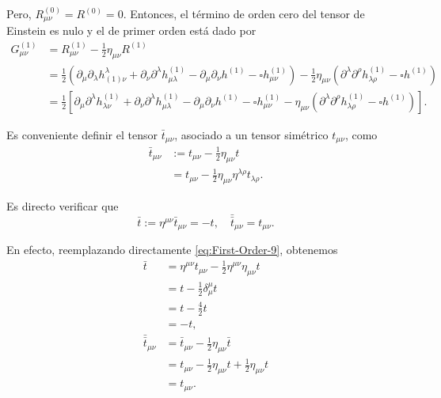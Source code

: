 \documentclass[letterpaper,11pt]{article}
\begin{document}
Pero, $R_{\mu\nu}^{(0)} = R^{(0)} = 0$. Entonces, el término de orden cero del tensor de Einstein es nulo y el de primer orden está dado por
\begin{align}
G_{\mu\nu}^{(1)} &= R_{\mu\nu}^{(1)} - \frac{1}{2}\eta_{\mu\nu} R^{(1)} \nonumber \\
&= \frac{1}{2} \left(\partial_{\mu} \partial_{\lambda} h_{(1)\nu}^{\lambda} + \partial_{\nu} \partial^{\lambda} h_{\mu\lambda}^{(1)}  - \partial_{\mu} \partial_{\nu} h^{(1)}  - \square h_{\mu\nu}^{(1)}  \right) - \frac{1}{2} \eta_{\mu\nu} \left( \partial^{\lambda}\partial^{\rho}  h_{\lambda\rho}^{(1)} - \square h^{(1)} \right)  \nonumber \\
&= \frac{1}{2} \left[\partial_{\mu} \partial^{\lambda} h_{\lambda\nu}^{(1)} + \partial_{\nu} \partial^{\lambda} h_{\mu\lambda}^{(1)}  - \partial_{\mu} \partial_{\nu} h^{(1)}  - \square h_{\mu\nu}^{(1)} -  \eta_{\mu\nu} \left( \partial^{\lambda}\partial^{\rho}  h_{\lambda\rho}^{(1)} - \square h^{(1)} \right) \right]. \label{eq:First-Order-8.5}
\end{align}

Es conveniente definir el tensor $\bar{t}_{\mu\nu}$, asociado a un tensor simétrico $t_{\mu\nu}$, como
\begin{align}
\bar{t}_{\mu\nu} &:= t_{\mu\nu} - \frac{1}{2} \eta_{\mu\nu} t \nonumber \\
&= t_{\mu\nu} - \frac{1}{2} \eta_{\mu\nu} \eta^{\lambda \rho} t_{\lambda\rho}. \label{eq:First-Order-9}
\end{align}

Es directo verificar que
\begin{equation}
\bar{t} := \eta^{\mu\nu} \bar{t}_{\mu\nu} = -t, \quad \bar{\bar{t}}_{\mu\nu} = t_{\mu\nu}.
\end{equation}

En efecto, reemplazando directamente \eqref{eq:First-Order-9}, obtenemos
\begin{align}
\bar{t} &= \eta^{\mu\nu} t_{\mu\nu} - \frac{1}{2} \eta^{\mu\nu} \eta_{\mu\nu} t \nonumber\\
&= t - \frac{1}{2} \delta_{\mu}^{\mu} t \nonumber\\
&= t - \frac{4}{2} t \nonumber\\
&= -t, \\
\bar{\bar{t}}_{\mu\nu} &= \bar{t}_{\mu\nu} - \frac{1}{2} \eta_{\mu\nu} \bar{t} \nonumber\\
&= t_{\mu\nu} - \frac{1}{2} \eta_{\mu\nu} t + \frac{1}{2}\eta_{\mu\nu} t \nonumber\\
&= t_{\mu\nu}.
\end{align}
\end{document}
